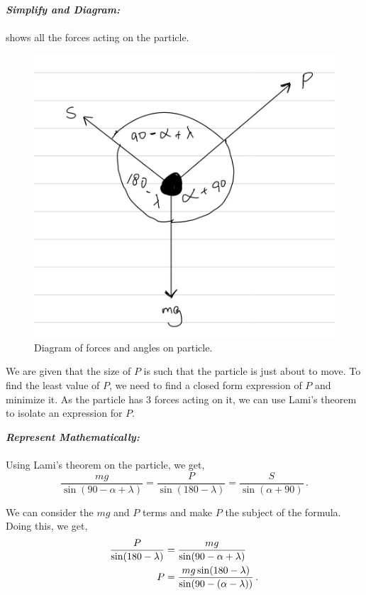 \begin{subquestions}
\begin{subsubquestions}
	\textbf{\textit{Simplify and Diagram:}} \\ \\
	 shows all the forces acting on the particle.
	\begin{figure} [H]
		\begin{center} 
			\includegraphics[scale=0.25]{../2014/figures/2014-q5-b-2}
			\caption{\label{2014:q5:Force2} Diagram of forces and angles on particle.}
		\end{center}
	\end{figure}
	
	We are given that the size of $P$ is such that the particle is just about to move. To find the least value of $P$, we need to find a closed form expression of $P$ and minimize it. As the particle has 3 forces acting on it, we can use Lami's theorem to isolate an expression for $P$.
	
	\textbf{\textit{Represent Mathematically:}} \\ \\
	Using Lami's theorem on the particle, we get,
	\begin{equation}
		\frac{mg}{\sin(90-\alpha+\lambda)} = \frac{P}{\sin(180-\lambda)} = \frac{S}{\sin(\alpha+90)} \,.
	\end{equation}
	
	We can consider the $mg$ and $P$ terms and make $P$ the subject of the formula. Doing this, we get,
	\begin{align}
		\frac{P}{\sin(180-\lambda)} & = \frac{mg}{\sin(90-\alpha+\lambda)}\nonumber \\
		P & = \frac{mg\sin(180-\lambda)}{\sin(90-(\alpha-\lambda))}\,.
	\end{align}
	

\end{subsubquestions}
\end{subquestions}
